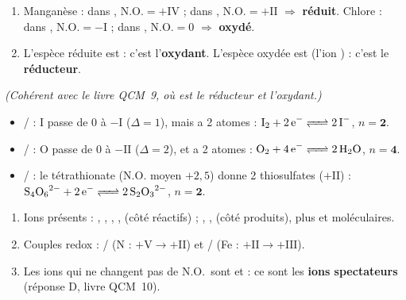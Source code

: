 \documentclass[11pt,a4paper]{article}
\newcommand{\NO}{\ensuremath{\mathrm{N.O.}}}
\begin{document}
\begin{corr}
\begin{enumerate}[label=(\alph*),leftmargin=2em,topsep=1pt,itemsep=1.5pt]
  \item Manganèse : dans , $\NO=+\mathrm{IV}$ ; dans , $\NO=+\mathrm{II}$ $\Rightarrow$ \textbf{réduit}.
        Chlore : dans , $\NO=-\mathrm{I}$ ; dans , $\NO=0$ $\Rightarrow$ \textbf{oxydé}.
  \item L'espèce réduite est  : c'est l'\textbf{oxydant}.
        L'espèce oxydée est  (l'ion ) : c'est le \textbf{réducteur}.
\end{enumerate}
\emph{(Cohérent avec le livre QCM~9, où  est le réducteur et  l'oxydant.)}
\end{corr}

\begin{corr}
\begin{itemize}[leftmargin=1.5em,topsep=1pt,itemsep=1.5pt]
  \item {}/ : I passe de $0$ à $-\mathrm{I}$ ($\Delta=1$), mais  a 2 atomes :
        $\ce{I2 + 2 e^- <=> 2 I^-}$, $n=\mathbf{2}$.
  \item {}/ : O passe de $0$ à $-\mathrm{II}$ ($\Delta=2$), et  a 2 atomes :
        $\ce{O2 + 4 e^- <=> 2 H2O}$, $n=\mathbf{4}$.
  \item {}/ : le tétrathionate ($\NO$ moyen $+2{,}5$) donne 2 thiosulfates ($+\mathrm{II}$) :
        $\ce{S4O6^{2-} + 2 e^- <=> 2 S2O3^{2-}}$, $n=\mathbf{2}$.
\end{itemize}
\end{corr}

\begin{corr}
\begin{enumerate}[label=(\alph*),leftmargin=2em,topsep=1pt,itemsep=1.5pt]
  \item Ions présents : , , , ,  (côté réactifs) ;
        , ,  (côté produits), plus  et  moléculaires.
  \item Couples redox : / (N : $+\mathrm{V}\to+\mathrm{II}$) et /
        (Fe : $+\mathrm{II}\to+\mathrm{III}$).
  \item Les ions qui ne changent pas de \NO\ sont  et  : ce sont les \textbf{ions spectateurs}
        (réponse D, livre QCM~10).
\end{enumerate}
\end{corr}
\end{document}
